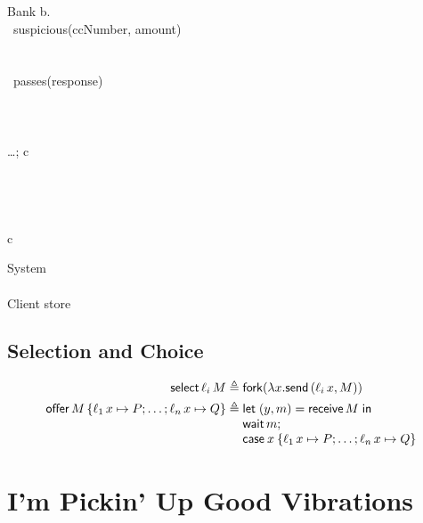 \documentclass[orivec,envcountsame]{llncs}
\begin{document}
\begin{code}
Bank  \lambda b. \bl
   \\
  \ suspicious(ccNumber, amount)\  \\
  \quad\bl
     \\
     \\
    \ passes(response)\  \\
    \quad \bl
       \\
       \\
       \\
      \dots; c \el \\
     \\
    \quad \bl
       \\
       \\
       \\
      c \el
  \el
\el
\end{code}

\begin{code}
System  \bl
   \\
   \\
  Client \app store
\el
\end{code}

\subsection{Selection and Choice}

\begin{align*}
  \gvconst{select} \app \ell_i \app M &\defeq \gvconst{fork} (\lambda x. \gvsend(\ell_i \app x, M)) \\
  \gvconst{offer} \app M \,\{ \ell_1 \app x \mapsto P; \dots; \ell_n \app x \mapsto Q \}
    &\defeq \bl \gvlet{(y,m)}{\gvreceive{M}}{\\\gvletunit{\gvconst{wait} \app m}{\\\gvcase{x}{\ell_1 \app x \mapsto P; \dots; \ell_n \app x \mapsto Q}}} \el
\end{align*}

\section{I'm Pickin' Up Good Vibrations}
\end{document}
